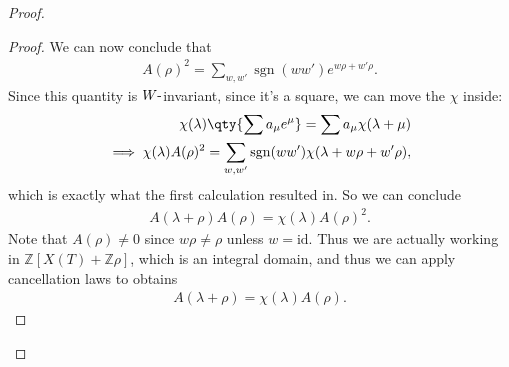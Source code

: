 \begin{proof}
\begin{proof}
We can now conclude that
\begin{align*}   A(\rho)^2 = \sum_{w, w'} \operatorname{sgn}(ww') e^{w\rho + w' \rho} .\end{align*}
Since this quantity is \(W{\hbox{-}}\)invariant, since it's a square, we
can move the \(\chi\) inside:
\begin{align*}   \chi(\lambda) \qty{ \sum a_\mu e^\mu } = \sum a_\mu \chi(\lambda + \mu) \\ \implies \chi(\lambda) A(\rho)^2 = \sum_{w, w'} \operatorname{sgn}(ww') \chi(\lambda + w\rho + w'\rho) ,\end{align*}
which is exactly what the first calculation resulted in. So we can
conclude
\begin{align*}   A(\lambda + \rho) A(\rho) = \chi(\lambda) A(\rho)^2 .\end{align*}
Note that \(A(\rho) \neq 0\) since \(w\rho \neq \rho\) unless
\(w=\text{id}\). Thus we are actually working in
\({\mathbb{Z}}[X(T) + {\mathbb{Z}}\rho]\), which is an integral domain,
and thus we can apply cancellation laws to obtains
\begin{align*}   A(\lambda + \rho) = \chi(\lambda) A(\rho) .\end{align*}

\end{proof}

\end{proof}

